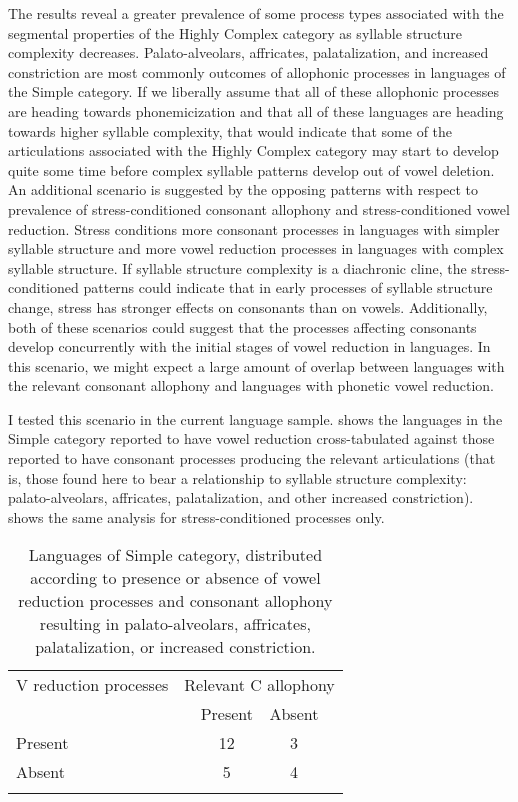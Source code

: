   The results reveal a greater prevalence of some process types associated with the segmental properties of the Highly Complex category as syllable structure complexity decreases. Palato-alveolars, affricates, palatalization, and increased constriction are most commonly outcomes of allophonic processes in languages of the Simple category. If we liberally assume that all of these allophonic processes are heading towards phonemicization and that all of these languages are heading towards higher syllable complexity, that would indicate that some of the articulations associated with the Highly Complex category may start to develop quite some time before complex syllable patterns develop out of vowel deletion. An additional scenario is suggested by the opposing patterns with respect to prevalence of stress-conditioned consonant allophony and stress-conditioned vowel reduction. Stress conditions more consonant processes in languages with simpler syllable structure and more vowel reduction processes in languages with complex syllable structure. If syllable structure complexity is a diachronic cline, the stress-conditioned patterns could indicate that in early processes of syllable structure change, stress has stronger effects on consonants than on vowels. Additionally, both of these scenarios could suggest that the processes affecting consonants develop concurrently with the initial stages of vowel reduction in languages. In this scenario, we might expect a large amount of overlap between languages with the relevant consonant allophony and languages with phonetic vowel reduction.

  I tested this scenario in the current language sample.  shows the languages in the Simple category reported to have vowel reduction cross-tabulated against those reported to have consonant processes producing the relevant articulations (that is, those found here to bear a relationship to syllable structure complexity: palato-alveolars, affricates, palatalization, and other increased constriction).  shows the same analysis for stress-conditioned processes only.

\begin{table}[H]\small
\begin{tabular}{llccl}%
\lsptoprule
 {V reduction processes} & \multicolumn{4}{c}{Relevant C allophony}\\\cmidrule(lr){2-5}
                         & & {Present} & {Absent} &\\\midrule
 {Present} & & 12 & 3 &\\
 {Absent} & & 5 & 4 &\\
\lspbottomrule
\end{tabular}
\caption{\label{tab:7.10}Languages of Simple category, distributed according to presence or absence of vowel reduction processes and consonant allophony resulting in palato-alveolars, affricates, palatalization, or increased constriction.}
\end{table}

